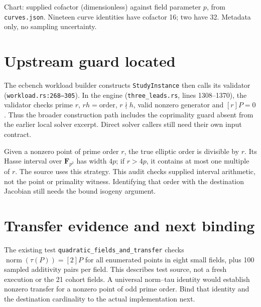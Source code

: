 \documentclass[10pt]{article}
\begin{document}
\begin{center}
\end{center}
\small Chart: supplied cofactor (dimensionless) against field parameter $p$, from \texttt{curves.json}. Nineteen curve identities have cofactor 16; two have 32. Metadata only, no sampling uncertainty.\normalsize
\section*{Upstream guard located}
The ecbench workload builder constructs \texttt{StudyInstance} then calls its validator (\texttt{workload.rs:268--305}). In the engine (\texttt{three\_leads.rs}, lines 1308--1370), the validator checks prime $r$, $rh=\mathrm{order}$, $r\nmid h$, valid nonzero generator and $[r]P=0$. Thus the broader construction path includes the coprimality guard absent from the earlier local solver excerpt. Direct solver callers still need their own input contract.

Given a nonzero point of prime order $r$, the true elliptic order is divisible by $r$. Its Hasse interval over $\mathbf F_{p^2}$ has width $4p$; if $r>4p$, it contains at most one multiple of $r$. The source uses this strategy. This audit checks supplied interval arithmetic, not the point or primality witness. Identifying that order with the destination Jacobian still needs the bound isogeny argument.
\section*{Transfer evidence and next binding}
The existing test \texttt{quadratic\_fields\_and\_transfer} checks $\operatorname{norm}(\tau(P))=[2]P$ for all enumerated points in eight small fields, plus 100 sampled additivity pairs per field. This describes test source, not a fresh execution or the 21 cohort fields. A universal norm--tau identity would establish nonzero transfer for a nonzero point of odd prime order. Bind that identity and the destination cardinality to the actual implementation next.
\end{document}
